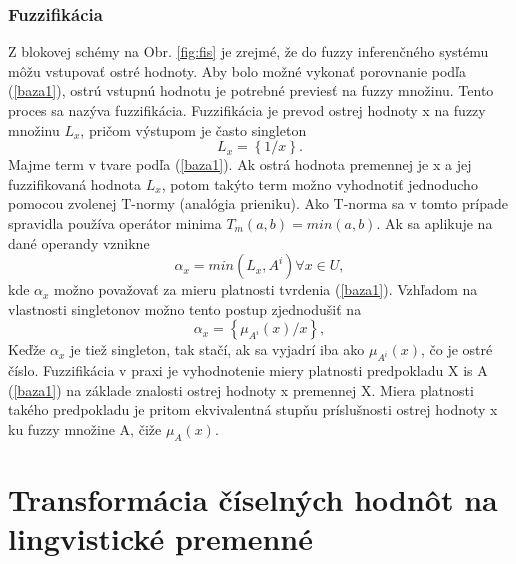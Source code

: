 \subsubsection{Fuzzifikácia}
Z blokovej schémy na Obr. \ref{fig:fis} je zrejmé, že do fuzzy inferenčného systému môžu vstupovať ostré hodnoty. Aby bolo možné vykonať porovnanie podľa (\ref{baza1}), ostrú vstupnú hodnotu je potrebné previesť na fuzzy množinu. Tento proces sa nazýva fuzzifikácia. Fuzzifikácia je prevod ostrej hodnoty x na fuzzy množinu $L_x$, pričom výstupom je často singleton \cite{gregorUI}
\begin{equation}\label{fuzzysingle1}
L_x = \left\lbrace1/x\right\rbrace .  
\end{equation}
Majme term v tvare podľa (\ref{baza1}). Ak ostrá hodnota premennej je x a jej fuzzifikovaná hodnota  $L_x$, potom takýto term možno vyhodnotiť jednoducho pomocou zvolenej T-normy (analógia prieniku). Ako T-norma sa v tomto prípade spravidla používa operátor minima  $T_m(a, b)=min(a, b)$. Ak sa aplikuje na dané operandy vznikne \cite{gregorUI}
\begin{equation}\label{fuzzimin}
\alpha_x = min(L_x, A^{i}) \forall x \in U, 
\end{equation}
kde $\alpha_x$ možno považovať za mieru platnosti tvrdenia (\ref{baza1}). 
Vzhľadom na vlastnosti singletonov možno tento postup zjednodušiť na 
\begin{equation}\label{fuzziminsingle}
\alpha_x = \left\lbrace \mu_{A^i}(x)/x\right\rbrace , 
\end{equation}
Keďže $\alpha_x$ je tiež singleton, tak stačí, ak sa vyjadrí iba ako $\mu_{A^i}(x)$, čo je ostré číslo. 
Fuzzifikácia v praxi je vyhodnotenie miery platnosti predpokladu X is A (\ref{baza1}) na základe znalosti ostrej hodnoty x premennej X. Miera platnosti takého predpokladu je pritom ekvivalentná stupňu príslušnosti ostrej hodnoty x ku fuzzy množine A, čiže  $\mu_{A}(x)$. \cite{gregorUI}  

\pagebreak








\pagebreak
\section{Transformácia číselných hodnôt na lingvistické premenné}





















